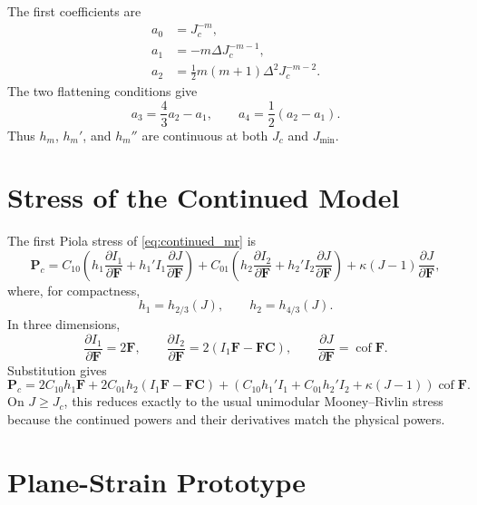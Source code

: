 \documentclass[11pt]{article}
\newcommand{\F}{\bm F}
\newcommand{\C}{\bm C}
\newcommand{\Pola}{\bm P}
\newcommand{\cof}{\operatorname{cof}}
\begin{document}
The first coefficients are
\begin{align}
  a_0 &= J_c^{-m},\\
  a_1 &= -m\Delta J_c^{-m-1},\\
  a_2 &= \frac{1}{2}m(m+1)\Delta^2J_c^{-m-2}.
\end{align}
The two flattening conditions give
\begin{equation}
  \boxed{
  a_3=\frac{4}{3}a_2-a_1,
  \qquad
  a_4=\frac{1}{2}(a_2-a_1).
  }
  \label{eq:quartic_coefficients}
\end{equation}
Thus $h_m$, $h_m'$, and $h_m''$ are continuous at both $J_c$ and $J_{\min}$.

\section{Stress of the Continued Model}

The first Piola stress of \eqref{eq:continued_mr} is
\begin{equation}
  \Pola_c
  =
  C_{10}\left(h_1\frac{\partial I_1}{\partial\F}
  +h_1'I_1\frac{\partial J}{\partial\F}\right)
  +
  C_{01}\left(h_2\frac{\partial I_2}{\partial\F}
  +h_2'I_2\frac{\partial J}{\partial\F}\right)
  +
  \kappa(J-1)\frac{\partial J}{\partial\F},
  \label{eq:general_piola}
\end{equation}
where, for compactness,
\begin{equation}
  h_1=h_{2/3}(J),\qquad h_2=h_{4/3}(J).
\end{equation}
In three dimensions,
\begin{equation}
  \frac{\partial I_1}{\partial\F}=2\F,
  \qquad
  \frac{\partial I_2}{\partial\F}
  =
  2(I_1\F-\F\C),
  \qquad
  \frac{\partial J}{\partial\F}=\cof\F.
\end{equation}
Substitution gives
\begin{equation}
  \boxed{
  \Pola_c
  =
  2C_{10}h_1\F
  +
  2C_{01}h_2(I_1\F-\F\C)
  +
  \left(C_{10}h_1'I_1+C_{01}h_2'I_2+\kappa(J-1)\right)\cof\F.
  }
  \label{eq:continued_piola_3d}
\end{equation}
On $J\ge J_c$, this reduces exactly to the usual unimodular
Mooney--Rivlin stress because the continued powers and their derivatives match
the physical powers.

\section{Plane-Strain Prototype}
\end{document}
